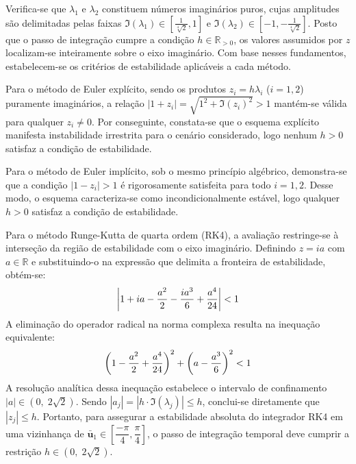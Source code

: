 \documentclass[12pt,a4paper]{article}
\newcommand{\bb}[1]{\bar{\textbf{#1}}} %
\begin{document}
    Verifica-se que $\lambda_1$ e $\lambda_2$ constituem números imaginários puros, cujas amplitudes são delimitadas pelas faixas $\Im(\lambda_1) \in \left[ \frac{1}{\sqrt[4]{2}}, 1\right]$ e $\Im(\lambda_2) \in \left[-1, -\frac{1}{\sqrt[4]{2}}\right]$. Posto que o passo de integração cumpre a condição $h\in \mathbb{R}_{>0}$, os valores assumidos por $z$ localizam-se inteiramente sobre o eixo imaginário. Com base nesses fundamentos, estabelecem-se os critérios de estabilidade aplicáveis a cada método.

    Para o método de Euler explícito, sendo os produtos $z_i = h\lambda_i$ ($i=1,2$) puramente imaginários, a relação $|1 + z_i| = \sqrt{1^2 + \Im(z_i)^2} > 1$ mantém-se válida para qualquer $z_i \ne 0$. Por conseguinte, constata-se que o esquema explícito manifesta instabilidade irrestrita para o cenário considerado, logo nenhum $h > 0$ satisfaz a condição de estabilidade.

    Para o método de Euler implícito, sob o mesmo princípio algébrico, demonstra-se que a condição $|1-z_i| > 1$ é rigorosamente satisfeita para todo $i=1,2$. Desse modo, o esquema caracteriza-se como incondicionalmente estável, logo qualquer $h > 0$ satisfaz a condição de estabilidade.

    Para o método Runge-Kutta de quarta ordem (RK4), a avaliação restringe-se à interseção da região de estabilidade com o eixo imaginário. Definindo $z=ia$ com $a \in \mathbb{R}$ e substituindo-o na expressão que delimita a fronteira de estabilidade, obtém-se:
    \begin{align}
        \left|1 + ia - \dfrac{a^2}{2} - \dfrac{ia^3}{6} + \dfrac{a^4}{24}\right| < 1 \notag
    \end{align}
    A eliminação do operador radical na norma complexa resulta na inequação equivalente:
    \begin{align}
        \left(1-\dfrac{a^2}{2} + \dfrac{a^4}{24}\right)^2 + \left(a - \dfrac{a^3}{6}\right)^2 < 1 \notag
    \end{align}
    A resolução analítica dessa inequação estabelece o intervalo de confinamento $|a| \in (0,\; 2\sqrt{2})$. Sendo $|a_j| = |h \cdot \Im(\lambda_j)| \le h$, conclui-se diretamente que $|z_j| \le h$. Portanto, para assegurar a estabilidade absoluta do integrador RK4 em uma vizinhança de $\bb{u}_1 \in \left[\dfrac{-\pi}{4}, \dfrac{\pi}{4}\right]$, o passo de integração temporal deve cumprir a restrição $h \in (0,\; 2\sqrt{2})$. 
\end{document}
